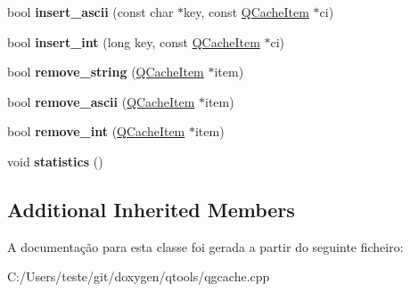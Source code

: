 \begin{DoxyCompactItemize}
\item 
\hypertarget{class_q_c_dict_acef7b0c828e147f5bb57cd0e91fab7d9}{bool {\bfseries insert\-\_\-ascii} (const char $\ast$key, const \hyperlink{struct_q_cache_item}{Q\-Cache\-Item} $\ast$ci)}\label{class_q_c_dict_acef7b0c828e147f5bb57cd0e91fab7d9}

\item 
\hypertarget{class_q_c_dict_aa535cde850bc90aff11e003f0d593582}{bool {\bfseries insert\-\_\-int} (long key, const \hyperlink{struct_q_cache_item}{Q\-Cache\-Item} $\ast$ci)}\label{class_q_c_dict_aa535cde850bc90aff11e003f0d593582}

\item 
\hypertarget{class_q_c_dict_a083cb68f3f18251df6a1e1b2ebcd1d46}{bool {\bfseries remove\-\_\-string} (\hyperlink{struct_q_cache_item}{Q\-Cache\-Item} $\ast$item)}\label{class_q_c_dict_a083cb68f3f18251df6a1e1b2ebcd1d46}

\item 
\hypertarget{class_q_c_dict_adc96b3bc948c4c5b26bb36a3f8402c15}{bool {\bfseries remove\-\_\-ascii} (\hyperlink{struct_q_cache_item}{Q\-Cache\-Item} $\ast$item)}\label{class_q_c_dict_adc96b3bc948c4c5b26bb36a3f8402c15}

\item 
\hypertarget{class_q_c_dict_ad21c22fac817dee581c2988485e88322}{bool {\bfseries remove\-\_\-int} (\hyperlink{struct_q_cache_item}{Q\-Cache\-Item} $\ast$item)}\label{class_q_c_dict_ad21c22fac817dee581c2988485e88322}

\item 
\hypertarget{class_q_c_dict_a1fc271c95844c5c853386a006d7f89f3}{void {\bfseries statistics} ()}\label{class_q_c_dict_a1fc271c95844c5c853386a006d7f89f3}

\end{DoxyCompactItemize}
\subsection*{Additional Inherited Members}


A documentação para esta classe foi gerada a partir do seguinte ficheiro\-:\begin{DoxyCompactItemize}
\item 
C\-:/\-Users/teste/git/doxygen/qtools/qgcache.\-cpp\end{DoxyCompactItemize}
